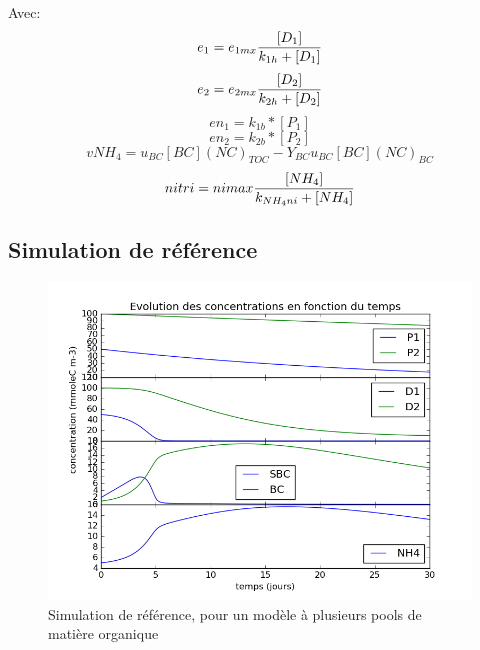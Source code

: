 \par{Avec:}
\begin{equation}
  e_1 = e_{1mx} {{[D_1]}\over{k_{1h} + [D_1]}}
  \label{eq:eq8}
\end{equation}
\begin{equation}
  e_2 = e_{2mx} {{[D_2]}\over{k_{2h} + [D_2]}}
  \label{eq:eq9}
\end{equation}
\begin{equation}
  en_1 = k_{1b} * [P_1]
  \label{eq:eq10}
\end{equation}
\begin{equation}
  en_2 = k_{2b} * [P_2]
  \label{eq:eq10}
\end{equation}
\begin{equation}
  vNH_4 = u_{BC} [BC] (NC)_{TOC} - Y_{BC} u_{BC} [BC] (NC)_{BC}
  \label{eq:eq6}
\end{equation}
\begin{equation}
  nitri = nimax {{[NH_4]}\over{k_{NH_4ni}+[NH_4]}}
  \label{eq:eq7}
\end{equation}

\FloatBarrier
\subsection{Simulation de r\'ef\'erence}

\begin{figure}[h!]
  \includegraphics[width=\textwidth]{partie2/Ref.png}
  \caption{Simulation de r\'ef\'erence, pour un mod\`ele \`a plusieurs pools de mati\`ere organique
  }
  \label{fig:partie2ref}
\end{figure}


